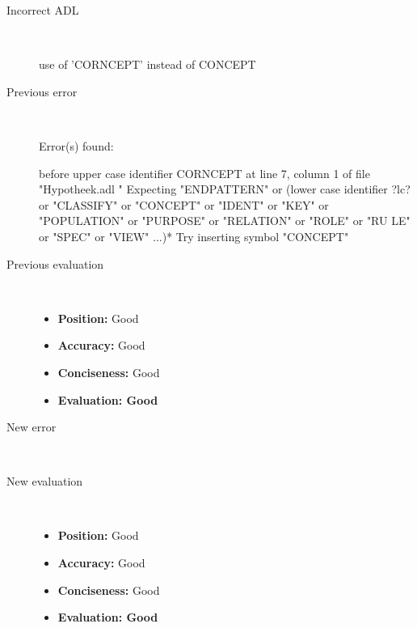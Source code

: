 \begin{description}
  \item[Incorrect ADL]~\\
\begin{adl}
use of 'CORNCEPT' instead of CONCEPT\end{adl}
  \item[Previous error]~\\
\begin{haskell}
Error(s) found:

before upper case identifier CORNCEPT at line 7, column 1 of file "Hypotheek.adl
"
Expecting "ENDPATTERN" or (lower case identifier ?lc? or "CLASSIFY" or "CONCEPT"
 or "IDENT" or "KEY" or "POPULATION" or "PURPOSE" or "RELATION" or "ROLE" or "RU
LE" or "SPEC" or "VIEW" ...)*
Try inserting symbol "CONCEPT"\end{haskell}
  \item[Previous evaluation]~\\
    \begin{itemize}
    \item \textbf{Position:} Good
    \item \textbf{Accuracy:} Good
    \item \textbf{Conciseness:} Good
    \item \textbf{Evaluation: Good}
    \end{itemize}
  \item[New error]~\\
\begin{haskell}
\end{haskell}
  \item[New evaluation]~\\
    \begin{itemize}
    \item \textbf{Position:} Good
    \item \textbf{Accuracy:} Good
    \item \textbf{Conciseness:} Good
    \item \textbf{Evaluation: Good}
    \end{itemize}
  \end{description}

\hrulefill

